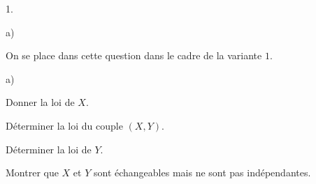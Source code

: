 \begin{noliste}{1.}
\begin{noliste}{a)}
\end{noliste}
\item On se place dans cette question dans le cadre de la variante $1$.
\begin{noliste}{a)}
\item Donner la loi de $X$.






\item Déterminer la loi du couple $(X,Y)$.




\item Déterminer la loi de $Y$.




\item Montrer que $X$ et $Y$ sont échangeables mais ne sont pas 
indépendantes.



\end{noliste}
\end{noliste}

